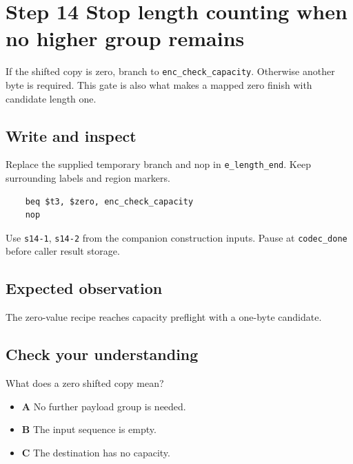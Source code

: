 \section{Step 14 Stop length counting when no higher group remains}\label{delta-s14}

If the shifted copy is zero, branch to \texttt{enc\_check\_capacity}. Otherwise another byte is required. This gate is also what makes a mapped zero finish with candidate length one.

\subsection{Write and inspect}
Replace the supplied temporary branch and nop in \texttt{e\_length\_end}. Keep surrounding labels and region markers.

\begin{verbatim}
    beq $t3, $zero, enc_check_capacity
    nop
\end{verbatim}
Use \texttt{s14-1}, \texttt{s14-2} from the companion construction inputs. Pause at \texttt{codec\_done} before caller result storage.

\subsection{Expected observation}
The zero-value recipe reaches capacity preflight with a one-byte candidate.

\subsection{Check your understanding}
What does a zero shifted copy mean?

\begin{itemize}
  \item \textbf{A} No further payload group is needed.
  \item \textbf{B} The input sequence is empty.
  \item \textbf{C} The destination has no capacity.
\end{itemize}
